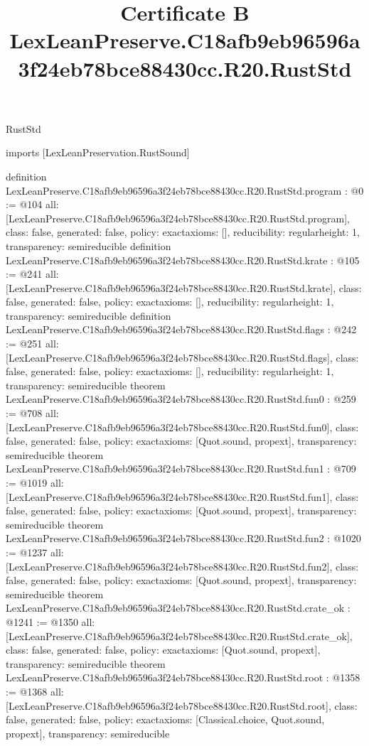 \begin{lexlean}{RustStd}
\title{Certificate B LexLeanPreserve.C18afb9eb96596a3f24eb78bce88430cc.R20.RustStd}
\begin{coremodule}
imports [LexLeanPreservation.RustSound]

definition LexLeanPreserve.C18afb9eb96596a3f24eb78bce88430cc.R20.RustStd.program : @0 := @104 {
  all: [LexLeanPreserve.C18afb9eb96596a3f24eb78bce88430cc.R20.RustStd.program],
  class: false,
  generated: false,
  policy: exact{axioms: []},
  reducibility: regular{height: 1},
  transparency: semireducible
}
definition LexLeanPreserve.C18afb9eb96596a3f24eb78bce88430cc.R20.RustStd.krate : @105 := @241 {
  all: [LexLeanPreserve.C18afb9eb96596a3f24eb78bce88430cc.R20.RustStd.krate],
  class: false,
  generated: false,
  policy: exact{axioms: []},
  reducibility: regular{height: 1},
  transparency: semireducible
}
definition LexLeanPreserve.C18afb9eb96596a3f24eb78bce88430cc.R20.RustStd.flags : @242 := @251 {
  all: [LexLeanPreserve.C18afb9eb96596a3f24eb78bce88430cc.R20.RustStd.flags],
  class: false,
  generated: false,
  policy: exact{axioms: []},
  reducibility: regular{height: 1},
  transparency: semireducible
}
theorem LexLeanPreserve.C18afb9eb96596a3f24eb78bce88430cc.R20.RustStd.fun0 : @259 := @708 {
  all: [LexLeanPreserve.C18afb9eb96596a3f24eb78bce88430cc.R20.RustStd.fun0],
  class: false,
  generated: false,
  policy: exact{axioms: [Quot.sound, propext]},
  transparency: semireducible
}
theorem LexLeanPreserve.C18afb9eb96596a3f24eb78bce88430cc.R20.RustStd.fun1 : @709 := @1019 {
  all: [LexLeanPreserve.C18afb9eb96596a3f24eb78bce88430cc.R20.RustStd.fun1],
  class: false,
  generated: false,
  policy: exact{axioms: [Quot.sound, propext]},
  transparency: semireducible
}
theorem LexLeanPreserve.C18afb9eb96596a3f24eb78bce88430cc.R20.RustStd.fun2 : @1020 := @1237 {
  all: [LexLeanPreserve.C18afb9eb96596a3f24eb78bce88430cc.R20.RustStd.fun2],
  class: false,
  generated: false,
  policy: exact{axioms: [Quot.sound, propext]},
  transparency: semireducible
}
theorem LexLeanPreserve.C18afb9eb96596a3f24eb78bce88430cc.R20.RustStd.crate_ok : @1241 := @1350 {
  all: [LexLeanPreserve.C18afb9eb96596a3f24eb78bce88430cc.R20.RustStd.crate_ok],
  class: false,
  generated: false,
  policy: exact{axioms: [Quot.sound, propext]},
  transparency: semireducible
}
theorem LexLeanPreserve.C18afb9eb96596a3f24eb78bce88430cc.R20.RustStd.root : @1358 := @1368 {
  all: [LexLeanPreserve.C18afb9eb96596a3f24eb78bce88430cc.R20.RustStd.root],
  class: false,
  generated: false,
  policy: exact{axioms: [Classical.choice, Quot.sound, propext]},
  transparency: semireducible
}


\end{coremodule}
\end{lexlean}
